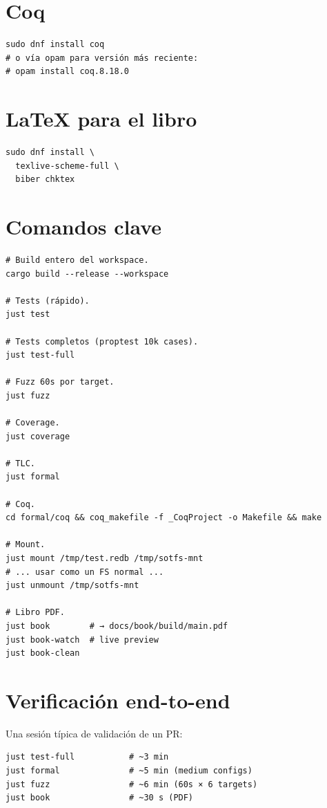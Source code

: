 \section*{Coq}

\begin{lstlisting}[language=shellcmd]
sudo dnf install coq
# o vía opam para versión más reciente:
# opam install coq.8.18.0
\end{lstlisting}

\section*{LaTeX para el libro}

\begin{lstlisting}[language=shellcmd]
sudo dnf install \
  texlive-scheme-full \
  biber chktex
\end{lstlisting}

\section*{Comandos clave}

\begin{lstlisting}[language=shellcmd]
# Build entero del workspace.
cargo build --release --workspace

# Tests (rápido).
just test

# Tests completos (proptest 10k cases).
just test-full

# Fuzz 60s por target.
just fuzz

# Coverage.
just coverage

# TLC.
just formal

# Coq.
cd formal/coq && coq_makefile -f _CoqProject -o Makefile && make

# Mount.
just mount /tmp/test.redb /tmp/sotfs-mnt
# ... usar como un FS normal ...
just unmount /tmp/sotfs-mnt

# Libro PDF.
just book        # → docs/book/build/main.pdf
just book-watch  # live preview
just book-clean
\end{lstlisting}

\section*{Verificación end-to-end}

Una sesión típica de validación de un PR:

\begin{lstlisting}[language=shellcmd]
just test-full           # ~3 min
just formal              # ~5 min (medium configs)
just fuzz                # ~6 min (60s × 6 targets)
just book                # ~30 s (PDF)
\end{lstlisting}

